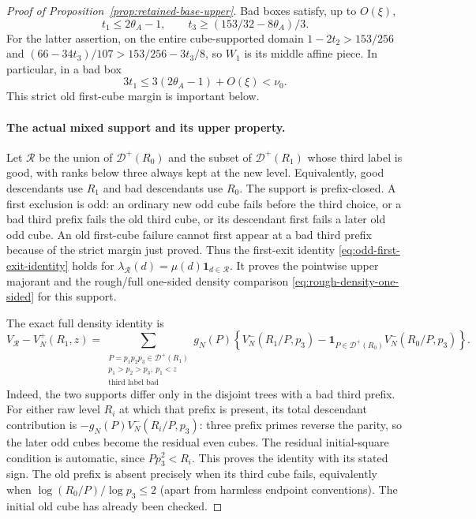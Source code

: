 \documentclass[11pt]{article}
\begin{document}
\begin{proof}[Proof of Proposition~\ref{prop:retained-base-upper}]
Bad boxes satisfy, up to $O(\xi)$,
\[
 t_1\le2\theta_A-1,\qquad
 t_3\ge(153/32-8\theta_A)/3.
\]
For the latter assertion, on the entire cube-supported domain
$1-2t_2>153/256$ and
$(66-34t_3)/107>153/256-3t_3/8$, so $W_1$ is its middle
affine piece. In particular, in a bad box
\[
 3t_1\le3(2\theta_A-1)+O(\xi)<\nu_0.
\]
This strict old first-cube margin is important below.

\paragraph{The actual mixed support and its upper property.}
Let $\mathcal R$ be the union of $\mathcal D^+(R_0)$ and
the subset of $\mathcal D^+(R_1)$ whose third label is good,
with ranks below three always kept at the new level. Equivalently,
good descendants use $R_1$ and bad descendants use $R_0$.
The support is prefix-closed. A first exclusion is odd: an ordinary
new odd cube fails before the third choice, or a bad third prefix
fails the old third cube, or its descendant first fails a later old
odd cube. An old first-cube failure cannot first appear at a bad
third prefix because of the strict margin just proved.
Thus the first-exit identity \eqref{eq:odd-first-exit-identity}
holds for $\lambda_{\mathcal R}(d)=\mu(d)\mathbf1_{d\in\mathcal R}$.
It proves the pointwise upper majorant and the rough/full one-sided
density comparison \eqref{eq:rough-density-one-sided} for this support.

The exact full density identity is
\begin{equation}\label{eq:retained-base-exact-density}
 V_{\mathcal R}-V_N^+(R_1,z)
 =\sum_{\substack{P=p_1p_2p_3\in\mathcal D^+(R_1)\\
        p_1>p_2>p_3,\ p_1<z\\\text{third label bad}}}
 g_N(P)\left\{V_N^-(R_1/P,p_3)
 -\mathbf1_{P\in\mathcal D^+(R_0)}V_N^-(R_0/P,p_3)\right\}.
\end{equation}
Indeed, the two supports differ only in the disjoint trees with a
bad third prefix. For either raw level $R_i$ at which that prefix is
present, its total descendant contribution is
$-g_N(P)V_N^-(R_i/P,p_3)$: three prefix primes reverse the
parity, so the later odd cubes become the residual even cubes.
The residual initial-square condition is automatic, since
$Pp_3^2<R_i$. This proves the identity with its stated sign.
The old prefix is absent precisely when its third cube fails,
equivalently when $\log(R_0/P)/\log p_3\le2$ (apart from harmless
endpoint conventions). The initial old cube has already been checked.


\end{proof}
\end{document}
